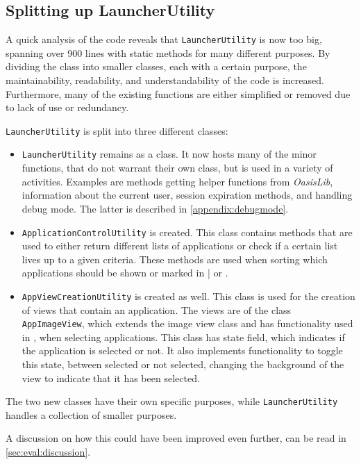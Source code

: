 \subsection{Splitting up LauncherUtility}\label{sect:sprint4:refactoring}

A quick analysis of the code reveals that \lstinline|LauncherUtility| is now too big, spanning over 900 lines with static methods for many different purposes.
By dividing the class into smaller classes, each with a certain purpose, the maintainability, readability, and understandability of the code is increased.
Furthermore, many of the existing functions are either simplified or removed due to lack of use or redundancy.

\lstinline|LauncherUtility| is split into three different classes:

\begin{itemize}
\item \lstinline|LauncherUtility| remains as a class.
It now hosts many of the minor functions, that do not warrant their own class, but is used in a variety of activities.
Examples are methods getting helper functions from \textit{OasisLib}, information about the current user, session expiration methods, and handling debug mode.
The latter is described in \cref{appendix:debugmode}.
\item \lstinline|ApplicationControlUtility| is created.
This class contains methods that are used to either return different lists of applications or check if a certain list lives up to a given criteria.
These methods are used when sorting which applications should be shown or marked in \settingsactivity| or \homeactivity.
\item \lstinline|AppViewCreationUtility| is created as well.
This class is used for the creation of views that contain an application.
The views are of the class \lstinline|AppImageView|, which extends the image view class and has functionality used in \settingsactivity, when selecting applications. 
This class has state field, which indicates if the application is selected or not. 
It also implements functionality to toggle this state, between selected or not selected, changing the background of the view to indicate that it has been selected.
\end{itemize}

The two new classes have their own specific purposes, while \lstinline|LauncherUtility| handles a collection of smaller purposes.

A discussion on how this could have been improved even further, can be read in \cref{sec:eval:discussion}.
